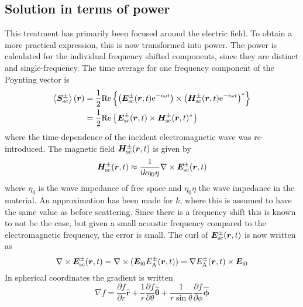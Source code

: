 \documentclass[11pt,twoside]{eitExjobb}
\begin{document}
	\subsection{Solution in terms of power \label{sec:app-derivations-radar-power}}
	This treatment has primarily been focused around the electric field. To obtain a more practical expression, this is now transformed into power. The power is calculated for the individual frequency shifted components, since they are distinct and single-frequency. The time average for one frequency component of the Poynting vector is \cite{Kristensson2008}
	\begin{equation*}
	\begin{split}
		\left< \bm{S}_{\mathrm{sc}}^\pm \right> (\bm{r}) &= \frac{1}{2} \mathrm{Re}\left\{ \left( \bm{E}_{\mathrm{sc}}^\pm (\bm{r}, t) \mathrm{e}^{-i\omega t} \right) \times \left( \bm{H}_{\mathrm{sc}}^{\pm} (\bm{r}, t) \mathrm{e}^{-i\omega t} \right)^* \right\} \\
		&= \frac{1}{2} \mathrm{Re}\left\{ \bm{E}_{\mathrm{sc}}^\pm (\bm{r}, t) \times \bm{H}_{\mathrm{sc}}^{\pm} (\bm{r}, t)^* \right\}
	\end{split}
	\end{equation*}
	where the time-dependence of the incident electromagnetic wave was re-introduced. The magnetic field $\bm{H}_{\mathrm{sc}}^\pm (\bm{r}, t)$ is given by \cite{Kristensson2008}
	\begin{equation*}
		\bm{H}_{\mathrm{sc}}^\pm (\bm{r}, t) \approx \frac{1}{\mathrm{i} k \eta_0 \eta} \nabla \times \bm{E}_{\mathrm{sc}}^\pm (\bm{r}, t)
	\end{equation*}
	where $\eta_0$ is the wave impedance of free space and $\eta_0 \eta$ the wave impedance in the material. An approximation has been made for $k$, where this is assumed to have the same value as before scattering. Since there is a frequency shift this is known to not be the case, but given a small acoustic frequency compared to the electromagnetic frequency, the error is small. The curl of $\bm{E}_{\mathrm{sc}}^\pm (\bm{r}, t)$ is now written as
	\begin{equation*}
		\nabla \times \bm{E}_{\mathrm{sc}}^\pm (\bm{r}, t) = \nabla \times (\bm{E}_{\mathrm{i}0} E_{\mathrm{A}}^\pm (\bm{r},t)) = \nabla E_{\mathrm{A}}^\pm (\bm{r},t) \times \bm{E}_{\mathrm{i}0}
	\end{equation*}
	In spherical coordinates the gradient is written \addref
	\begin{equation*}
		\nabla f = \frac{\partial f}{\partial r} \bm{\hat{r}} + \frac{1}{r} \frac{\partial f}{\partial \theta} \bm{\hat{\theta}} + \frac{1}{r\sin{\theta}} \frac{\partial f}{\partial \phi} \bm{\hat{\phi}}
	\end{equation*}
\end{document}
